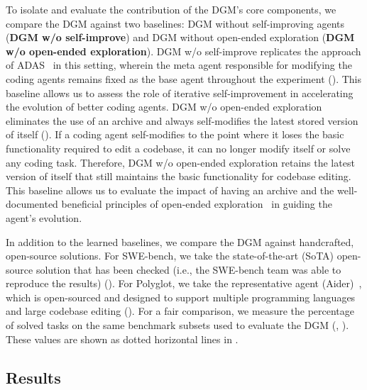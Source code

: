 To isolate and evaluate the contribution of the DGM's core components, we compare the DGM against two baselines: DGM without self-improving agents (\textbf{DGM w/o self-improve}) and DGM without open-ended exploration (\textbf{DGM w/o open-ended exploration}). DGM w/o self-improve replicates the approach of ADAS~\citep{hu2025automated} in this setting, wherein the meta agent responsible for modifying the coding agents remains fixed as the base agent throughout the experiment (). This baseline allows us to assess the role of iterative self-improvement in accelerating the evolution of better coding agents. DGM w/o open-ended exploration eliminates the use of an archive and always self-modifies the latest stored version of itself (). If a coding agent self-modifies to the point where it loses the basic functionality required to edit a codebase, it can no longer modify itself or solve any coding task. Therefore, DGM w/o open-ended exploration retains the latest version of itself that still maintains the basic functionality for codebase editing. This baseline allows us to evaluate the impact of having an archive and the well-documented beneficial principles of open-ended exploration~\citep{clune2019ai, stanley2015greatness, zhang2024omni, fernandopromptbreeder, lee2020learning, samvelyan2024rainbow, colas2022autotelic} in guiding the agent's evolution.

In addition to the learned baselines, we compare the DGM against handcrafted, open-source solutions. For SWE-bench, we take the state-of-the-art (SoTA) open-source solution that has been checked (i.e., the SWE-bench team was able to reproduce the results) (). For Polyglot, we take the representative agent (Aider)~\citep{aider2024}, which is open-sourced and designed to support multiple programming languages and large codebase editing (). For a fair comparison, we measure the percentage of solved tasks on the same benchmark subsets used to evaluate the DGM (, ). These values are shown as dotted horizontal lines in .

\subsection{Results}
\label{sec:results}

